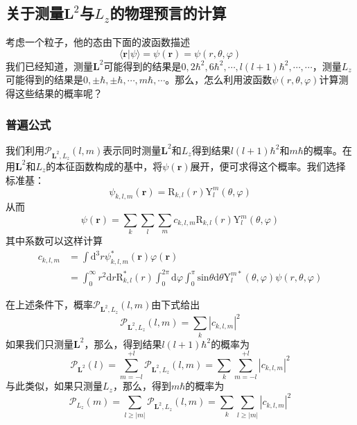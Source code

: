 \documentclass[]{article}
\begin{document}
\subsection{关于测量$\boldsymbol{L}^2$与$L_z$的物理预言的计算}
考虑一个粒子，他的态由下面的波函数描述
\begin{equation}
	\langle\boldsymbol{r}|\psi\rangle=\psi(\boldsymbol{r})=\psi(r,\theta,\varphi)
\end{equation}
我们已经知道，测量$\boldsymbol{L}^2$可能得到的结果是$0,2\hbar^2,6\hbar^2,\cdots,l(l+1)\hbar^2,\cdots,\cdots$，测量$L_z$可能得到的结果是$0,\pm\hbar,\pm\hbar,\cdots,m\hbar,\cdots$。那么，怎么利用波函数$\psi(r,\theta,\varphi)$计算测得这些结果的概率呢？
\subsubsection{普遍公式}
我们利用$\mathscr{P}_{\boldsymbol{L}^2,L_z}(l,m)$表示同时测量$\boldsymbol{L}^2$和$L_z$得到结果$l(l+1)\hbar^2$和$m\hbar$的概率。在用$\boldsymbol{L}^2$和$L_z$的本征函数构成的基中，将$\psi(\boldsymbol{r})$展开，便可求得这个概率。我们选择标准基：
\begin{equation}
	\psi_{k,l,m}(\boldsymbol{r})=\mathrm{R}_{k,l}(r)\mathrm{Y}_l^m(\theta,\varphi)
\end{equation}
从而
\begin{equation}
	\psi(\boldsymbol{r})=\sum\limits_{k}\sum\limits_{l}\sum\limits_{m}c_{k,l,m}\mathrm{R}_{k,l}(r)\mathrm{Y}_l^m(\theta,\varphi)
	\label{d53d53}
\end{equation}
其中系数可以这样计算
\begin{align}
	c_{k,l,m}&=\int\mathrm{d}^3r\psi^*_{k,l,m}(\boldsymbol{r})\varphi(\boldsymbol{r})\nonumber\\
	&=\int_{0}^{\infty}r^2\mathrm{d}r\mathrm{R}^*_{k,l}(r)\int_{0}^{2\pi}\mathrm{d}\varphi\int_{0}^{\pi}\mathrm{sin}\theta\mathrm{d}\theta\mathrm{Y}^{m*}_l(\theta,\varphi)\psi(r,\theta,\varphi)
	\label{d54d54}
\end{align}

在上述条件下，概率$\mathscr{P}_{\boldsymbol{L}^2,L_z}(l,m)$由下式给出
\begin{equation}
	\mathscr{P}_{\boldsymbol{L}^2,L_z}(l,m)=\sum\limits_{k}|c_{k,l,m}|^2
	\label{d55d55}
\end{equation}
如果我们只测量$\boldsymbol{L}^2$，那么，得到结果$l(l+1)\hbar^2$的概率为
\begin{equation}
	\mathscr{P}_{\boldsymbol{L}^2}(l)=\sum\limits_{m=-l}^{+l}\mathscr{P}_{\boldsymbol{L}^2,L_z}(l,m)=\sum\limits_{k}\sum\limits_{m=-l}^{+l}|c_{k,l,m}|^2
	\label{d56d56}
\end{equation}
与此类似，如果只测量$L_z$，那么，得到$m\hbar$的概率为
\begin{equation}
	\mathscr{P}_{L_z}(m)=\sum\limits_{l\geqslant|m|}\mathscr{P}_{\boldsymbol{L}^2,L_z}(l,m)=\sum\limits_{k}\sum\limits_{l\geqslant|m|}|c_{k,l,m}|^2
	\label{d57d57}
\end{equation}
\end{document}
